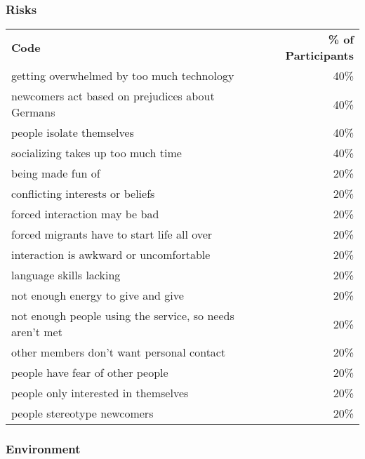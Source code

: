 \subsubsection*{Risks}

\begin{longtable}{p{}r}
\textbf{Code}                                            & \textbf{\% of Participants} \\
getting overwhelmed by too much technology               & 40\%                        \\
newcomers act based on prejudices about Germans          & 40\%                        \\
people isolate themselves                                & 40\%                        \\
socializing takes up too much time                       & 40\%                        \\
being made fun of                                        & 20\%                        \\
conflicting interests or beliefs                         & 20\%                        \\
forced interaction may be bad                            & 20\%                        \\
forced migrants have to start life all over              & 20\%                        \\
interaction is awkward or uncomfortable                  & 20\%                        \\
language skills lacking                                  & 20\%                        \\
not enough energy to give and give                       & 20\%                        \\
not enough people using the service, so needs aren't met & 20\%                        \\
other members don't want personal contact                & 20\%                        \\
people have fear of other people                         & 20\%                        \\
people only interested in themselves                     & 20\%                        \\
people stereotype newcomers                              & 20\%
\end{longtable}

\subsubsection*{Environment}

